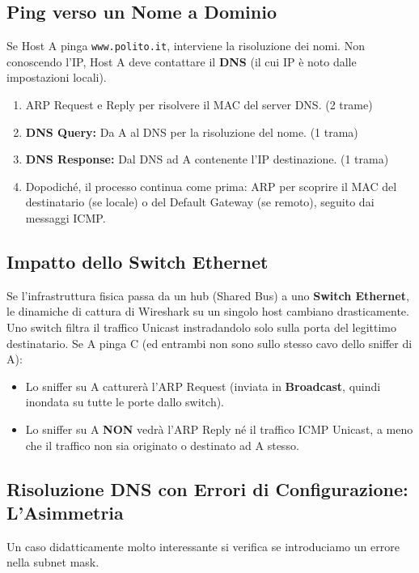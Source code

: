 \subsection{Ping verso un Nome a Dominio}
Se Host A pinga \texttt{www.polito.it}, interviene la risoluzione dei nomi. Non conoscendo l'IP, Host A deve contattare il \textbf{DNS} (il cui IP è noto dalle impostazioni locali).
\begin{enumerate}
    \item ARP Request e Reply per risolvere il MAC del server DNS. (2 trame)
    \item \textbf{DNS Query:} Da A al DNS per la risoluzione del nome. (1 trama)
    \item \textbf{DNS Response:} Dal DNS ad A contenente l'IP destinazione. (1 trama)
    \item Dopodiché, il processo continua come prima: ARP per scoprire il MAC del destinatario (se locale) o del Default Gateway (se remoto), seguito dai messaggi ICMP.
\end{enumerate}

\subsection{Impatto dello Switch Ethernet}
Se l'infrastruttura fisica passa da un hub (Shared Bus) a uno \textbf{Switch Ethernet}, le dinamiche di cattura di Wireshark su un singolo host cambiano drasticamente. Uno switch filtra il traffico Unicast instradandolo solo sulla porta del legittimo destinatario.
Se A pinga C (ed entrambi non sono sullo stesso cavo dello sniffer di A):
\begin{itemize}
    \item Lo sniffer su A catturerà l'ARP Request (inviata in \textbf{Broadcast}, quindi inondata su tutte le porte dallo switch).
    \item Lo sniffer su A \textbf{NON} vedrà l'ARP Reply né il traffico ICMP Unicast, a meno che il traffico non sia originato o destinato ad A stesso.
\end{itemize}

\subsection{Risoluzione DNS con Errori di Configurazione: L'Asimmetria}

Un caso didatticamente molto interessante si verifica se introduciamo un errore nella subnet mask.


